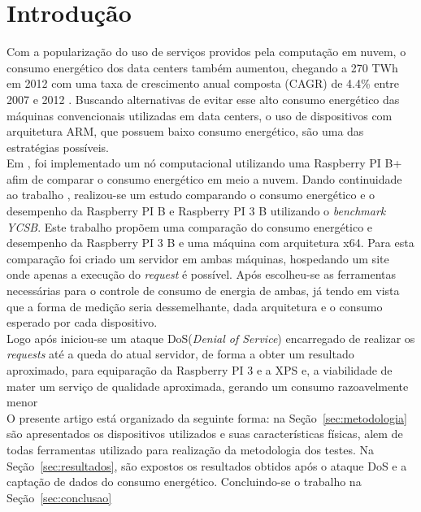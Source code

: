 \documentclass[12pt]{article}
\begin{document}
\section{Introdução}
  Com a popularização do uso de serviços providos pela computação em nuvem, o consumo energético dos data centers também aumentou, chegando a 270 TWh em 2012 com uma taxa de crescimento anual composta (CAGR) de 4.4\% entre 2007 e 2012 \cite{VanHeddeghem:2014:TWI:2657027.2657141}. Buscando alternativas de evitar esse alto consumo energético das máquinas convencionais utilizadas em data centers, o uso de dispositivos com arquitetura ARM, que possuem baixo consumo energético, são uma das estratégias possíveis.\\  
  Em \cite{Joao}, foi implementado um nó computacional utilizando uma Raspberry PI B+ afim de comparar o consumo energético em meio a nuvem.
  Dando continuidade ao trabalho \cite{eu}, realizou-se um estudo comparando o consumo energético e o desempenho da Raspberry PI B e Raspberry PI 3 B utilizando o \textit{benchmark YCSB}. Este trabalho propõem uma comparação do consumo energético e desempenho da Raspberry PI 3 B e uma máquina com arquitetura x64. Para esta comparação foi criado um servidor em ambas máquinas, hospedando um site onde apenas a execução do \textit{request} é possível. Após escolheu-se as ferramentas necessárias para o controle de consumo de energia de ambas, já tendo em vista que a forma de medição seria dessemelhante, dada arquitetura e o consumo esperado por cada dispositivo.\\
  Logo após iniciou-se um ataque DoS(\textit{Denial of Service}) encarregado de realizar os \textit{requests} até a queda do atual servidor, de forma a obter um resultado aproximado, para equiparação da Raspberry PI 3 e a XPS e, a viabilidade de mater um serviço de qualidade aproximada, gerando um consumo razoavelmente menor\\
  O presente artigo está organizado da seguinte forma: na Seção~\ref{sec:metodologia} são apresentados os dispositivos utilizados e suas características físicas, alem de todas ferramentas utilizado para realização da metodologia dos testes. Na Seção~\ref{sec:resultados}, são expostos os resultados obtidos após o ataque DoS e a captação de dados do consumo energético. Concluindo-se o trabalho na Seção~\ref{sec:conclusao}
\end{document}
